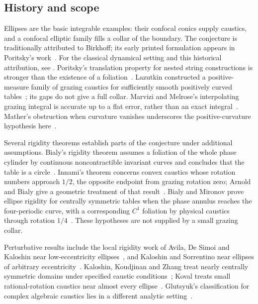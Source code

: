 \subsection{History and scope}

Ellipses are the basic integrable examples: their confocal conics supply
caustics, and a confocal elliptic family fills a collar of the boundary.
The conjecture is traditionally attributed to Birkhoff; its early
printed formulation appears in Poritsky's work~\cite{Poritsky1950}.
For the classical dynamical setting and this historical attribution,
see \cite{Birkhoff1927,KS2018}. Poritsky's translation property for
nested string constructions is stronger than the existence of a
foliation~\cite{Poritsky1950}. Lazutkin constructed a positive-measure
family of grazing caustics for sufficiently smooth positively curved
tables~\cite{Lazutkin1973}; its gaps do not give a full collar.
Marvizi and Melrose's interpolating grazing integral is accurate up to
a flat error, rather than an exact integral~\cite{MM1982}. Mather's
obstruction when curvature vanishes underscores the positive-curvature
hypothesis here~\cite{Mather1982}.

Several rigidity theorems establish parts of the conjecture under
additional assumptions. Bialy's rigidity theorem assumes a foliation
of the whole phase cylinder by continuous noncontractible invariant
curves and concludes that the table is a
circle~\cite{Bialy1993}. Innami's theorem concerns convex caustics
whose rotation numbers approach \(1/2\), the opposite endpoint from
grazing rotation zero; Arnold and Bialy give a geometric treatment of
that result~\cite{Innami2002,AB2018}. Bialy and Mironov prove ellipse
rigidity for centrally symmetric tables when the phase annulus reaches
the four-periodic curve, with a corresponding \(C^1\) foliation by
physical caustics through rotation \(1/4\)~\cite{BM2022}. These
hypotheses are not supplied by a small grazing collar.

Perturbative results include the local rigidity work of Avila, De
Simoi and Kaloshin near low-eccentricity ellipses~\cite{ADK2016}, and
Kaloshin and Sorrentino near ellipses of arbitrary
eccentricity~\cite{KS2018}. Kaloshin, Koudjinan and Zhang treat nearly
centrally symmetric domains under specified caustic
conditions~\cite{KKZ2024}; Koval treats small rational-rotation
caustics near almost every ellipse~\cite{Koval2026}. Glutsyuk's
classification for complex algebraic caustics lies in a different
analytic setting~\cite{Glutsyuk2026}.

